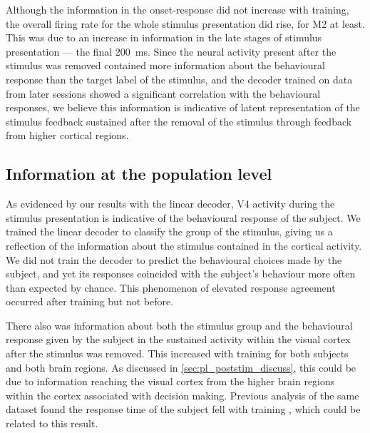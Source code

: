 Although the information in the onset-response did not increase with training, the overall firing rate for the whole stimulus presentation did rise, for \ac{M2} at least.
This was due to an increase in information in the late stages of stimulus presentation --- the final \SI{200}{\milli\second}.
Since the neural activity present after the stimulus was removed contained more information about the behavioural response than the target label of the stimulus, and the decoder trained on data from later sessions showed a significant correlation with the behavioural responses, we believe this information is indicative of latent representation of the stimulus feedback sustained after the removal of the stimulus through feedback from higher cortical regions.


\subsection{Information at the population level}

As evidenced by our results with the linear decoder, \ac{V4} activity during the stimulus presentation is indicative of the behavioural response of the subject.
We trained the linear decoder to classify the group of the stimulus, giving us a reflection of the information about the stimulus contained in the cortical activity.
We did not train the decoder to predict the behavioural choices made by the subject, and yet its responses coincided with the subject's behaviour more often than expected by chance.
This phenomenon of elevated response agreement occurred after training but not before.

There also was information about both the stimulus group and the behavioural response given by the subject in the sustained activity within the visual cortex after the stimulus was removed.
This increased with training for both subjects and both brain regions.
As discussed in \autoref{sec:pl_poststim_discuss}, this could be due to information reaching the visual cortex from the higher brain regions within the cortex associated with decision making.
Previous analysis of the same dataset found the response time of the subject fell with training \citep{Chen2013,Chen2013thesis}, which could be related to this result.

